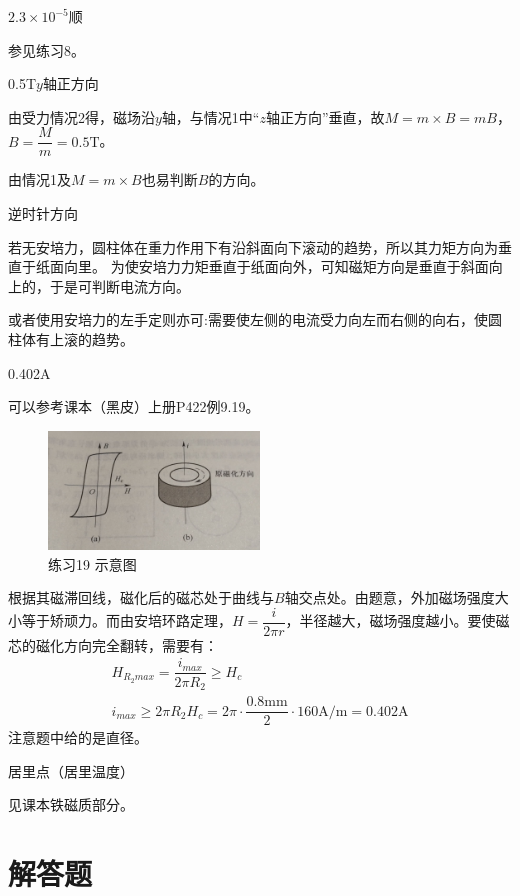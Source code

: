 \documentclass[b5paper,opensource,sourcefont,parskip]{qyxf-book}
\begin{document}
$2.3\times 10^{-5}$\quad 顺

\solve
参见练习8。

0.5T\quad $y$轴正方向

\solve
由受力情况2得，磁场沿$y$轴，与情况1中“$z$轴正方向”垂直，故$M=m\times B=mB$，$B=
\dfrac{M}{m}=0.5\textrm{T}$。

由情况1及$M=m\times B$也易判断$B$的方向。

逆时针方向

\solve
若无安培力，圆柱体在重力作用下有沿斜面向下滚动的趋势，所以其力矩方向为垂直于纸面向里。
为使安培力力矩垂直于纸面向外，可知磁矩方向是垂直于斜面向上的，于是可判断电流方向。

或者使用安培力的左手定则亦可:需要使左侧的电流受力向左而右侧的向右，使圆柱体有上滚的趋势。

0.402A

\solve
可以参考课本（黑皮）上册\rm{P}422例9.19。
\begin{figure}[!h]	
	\centering	
	\includegraphics[width=0.5\textwidth]{Chp9_illus2.jpg}	
	\caption{练习19 示意图}
\end{figure}

根据其磁滞回线，磁化后的磁芯处于曲线与$B$轴交点处。由题意，外加磁场强度大小等于矫顽力。而由安培环路定理，$H=\dfrac{i}{2\pi r}$，半径越大，磁场强度越小。要使磁芯的磁化方向完全翻转，需要有：
\begin{gather*}
H_{R_2max}=\dfrac{i_{max}}{2\pi R_2}\geqslant H_c\\
i_{max}\geqslant 2\pi R_2H_c=2\pi\cdot \dfrac{0.8\textrm{mm}}{2} \cdot 160\textrm{A/m}=0.402\textrm{A}
\end{gather*}
注意题中给的是直径。

居里点（居里温度）

\solve
见课本铁磁质部分。

\section{解答题}

\end{document}

